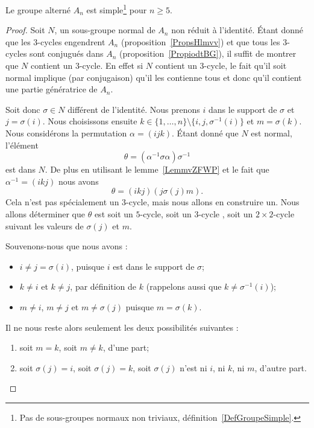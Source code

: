 \begin{theorem} \label{ThoURfSUXP}
    Le groupe alterné \( A_n\) est simple\footnote{Pas de sous-groupes normaux non triviaux, définition~\ref{DefGroupeSimple}.} pour \( n\geq 5\).
\end{theorem}


\begin{proof}
    Soit \( N\), un sous-groupe normal de \( A_n\) non réduit à l'identité. Étant donné que les \( 3\)-cycles engendrent \( A_n\) (proposition~\ref{PropsHlmvv}) et que tous les \( 3\)-cycles sont conjugués dans \( A_n\) (proposition~\ref{PropiodtBG}), il suffit de montrer que \( N\) contient un \( 3\)-cycle. En effet si \( N\) contient un \( 3\)-cycle, le fait qu'il soit normal implique (par conjugaison) qu'il les contienne tous et donc qu'il contient une partie génératrice de \( A_n\).

    Soit donc \( \sigma\in N\) différent de l'identité. Nous prenons \( i\) dans le support de \( \sigma\) et \( j=\sigma(i)\). Nous choisissons ensuite \( k\in\{ 1,\ldots, n \}\setminus\{ i,j,\sigma^{-1}(i) \}\) et \( m=\sigma(k)\). Nous considérons la permutation \( \alpha=(ijk)\). Étant donné que \( N\) est normal, l'élément
    \begin{equation}
        \theta=(\alpha^{-1}\sigma\alpha)\sigma^{-1}
    \end{equation}
    est dans \( N\). De plus en utilisant le lemme~\ref{LemmvZFWP} et le fait que \( \alpha^{-1}=(ikj)\) nous avons
    \begin{equation}
        \theta=(ikj)(j\sigma(j)m).
    \end{equation}
    Cela n'est pas spécialement un \( 3\)-cycle, mais nous allons en construire un. Nous allons déterminer que \( \theta\) est soit un \( 5\)-cycle, soit un \( 3\)-cycle , soit un \( 2\times 2\)-cycle suivant les valeurs de \( \sigma(j)\) et \( m\).

    Souvenons-nous que nous avons :
    \begin{itemize}
        \item
            \( i \neq j = \sigma(i) \), puisque $i$ est dans le support de \( \sigma \);
        \item
            \( k \neq i \) et \( k \neq j \), par définition de $k$ (rappelons aussi que \( k \neq \sigma^{-1}(i) \));
        \item
            \( m \neq i \), \( m \neq j \) et \( m \neq  \sigma(j) \) puisque \( m = \sigma(k) \).
    \end{itemize}
    Il ne nous reste alors seulement les deux possibilités suivantes :
    \begin{enumerate}
        \item
            soit \( m=k\), soit \( m \neq k \), d'une part;
        \item
            soit \( \sigma(j) = i \), soit \( \sigma(j) = k \), soit \( \sigma(j) \) n'est ni $i$, ni $k$, ni $m$, d'autre part.
    \end{enumerate}


\end{proof}

